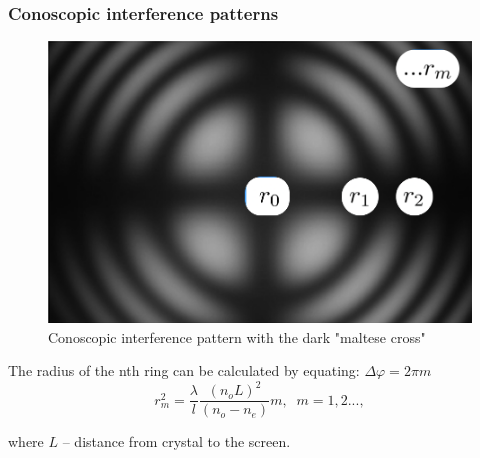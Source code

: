 \documentclass{beamer}
\begin{document}
\begin{frame}
	\frametitle{Conoscopic interference patterns}
	
	\begin{figure}
		\centering
		\includegraphics[width=0.5\linewidth]{res/pattern}
		\caption{Conoscopic interference pattern with the dark "maltese cross"}
	\end{figure}
	
	\footnotesize
	The radius of the nth ring can be calculated by equating: $\Delta \varphi = 2 \pi m$
	$$r^2_m = \frac{\lambda}{l} \frac{(n_o L)^2}{(n_o-n_e)} m,\;\; m = 1,2...,$$
	
	where $L$ -- distance from crystal to the screen.
\end{frame}
\end{document}
